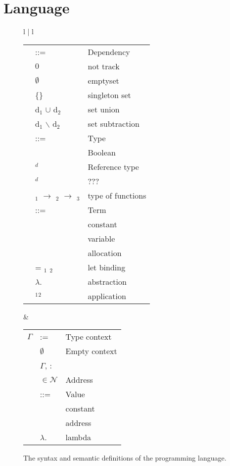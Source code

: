 \section{Language}
\begin{figure}[!htb]
\small
\centering
\begin{tabular}{l | l}
\begin{tabular}{r l l}
\nonterm{d} & ::=  & Dependency \\
& $0$ 	& not track \\
& $\emptyset$ &  emptyset \\
& \{\nonterm{x}\} & singleton set \\
& d$_1$ $\cup$ d$_2$  & set union \\
& d$_1$ $\backslash$ d$_2$ & set subtraction\\
\nonterm{T} & ::= & Type \\
& \nonterm{B} & Boolean \\
& \nonterm{ref}$^{d}$ & Reference type \\
& \nonterm{f}$^{d}$ & ??? \\
& \nonterm{T}$_1$ $\to$ \nonterm{T}$_2$ $\to$ \nonterm{T}$_3$ & type of functions \\
\nonterm{t} & ::= & Term \\
& \nonterm{c} & constant \\
& \nonterm{x} & variable \\
& \nonterm{alloc} & allocation \\
& \KW{let} \nonterm{x} = \nonterm{t}$_1$ \KW{in} \nonterm{t}$_2$  & let binding \\
& $\lambda$\nonterm{x}.\nonterm{t} & abstraction \\
& \nonterm{t}$_1$\nonterm{t}$_2$ & application \\
\end{tabular} &
\begin{tabular}{r l l}
$\Gamma$ & :=  & Type context \\
& $\emptyset$ & Empty context \\
& $\Gamma$, \nonterm{x}:\nonterm{T} \\
\nonterm{l} & $\in \mathcal{N}$  & Address \\
\nonterm{v} & ::= & Value \\
& \nonterm{c} & constant \\
& \nonterm{l} & address \\
& $\lambda$\nonterm{x}.\nonterm{t} & lambda \\
\end{tabular}
\end{tabular} %
\caption{The syntax and semantic definitions of the programming language.}
\label{fig:syntax}
\end{figure}

